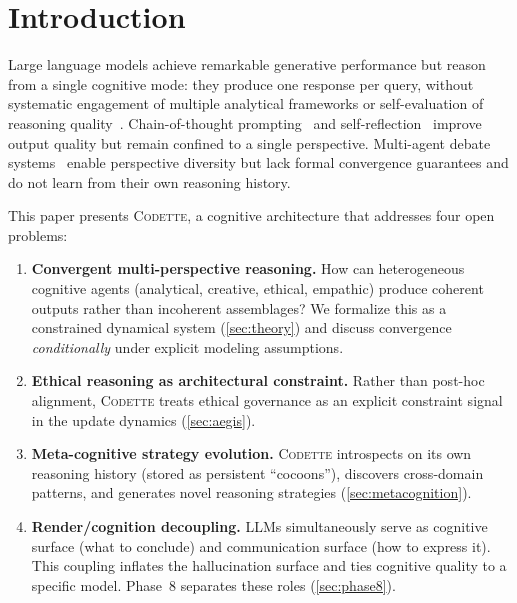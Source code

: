 \documentclass[11pt,a4paper]{article}
\newcommand{\codette}{\textsc{Codette}}
\begin{document}
\section{Introduction}
\label{sec:intro}

Large language models achieve remarkable generative performance but reason
from a single cognitive mode: they produce one response per query, without
systematic engagement of multiple analytical frameworks or self-evaluation of
reasoning quality~\citep{bender2021dangers,bommasani2021opportunities}.
Chain-of-thought prompting~\citep{wei2022chain} and self-reflection~\citep{shinn2023reflexion}
improve output quality but remain confined to a single perspective. Multi-agent
debate systems~\citep{wu2023autogen} enable perspective diversity but lack
formal convergence guarantees and do not learn from their own reasoning
history.

This paper presents \codette{}, a cognitive architecture that addresses four
open problems:

\begin{enumerate}[leftmargin=*]
  \item \textbf{Convergent multi-perspective reasoning.} How can heterogeneous
    cognitive agents (analytical, creative, ethical, empathic) produce coherent
    outputs rather than incoherent assemblages? We formalize this as a
    constrained dynamical system (\cref{sec:theory}) and discuss convergence
    \emph{conditionally} under explicit modeling assumptions.
  \item \textbf{Ethical reasoning as architectural constraint.} Rather than
    post-hoc alignment, \codette{} treats ethical governance as an explicit
    constraint signal in the update dynamics (\cref{sec:aegis}).
  \item \textbf{Meta-cognitive strategy evolution.} \codette{} introspects on
    its own reasoning history (stored as persistent ``cocoons''), discovers
    cross-domain patterns, and generates novel reasoning strategies
    (\cref{sec:metacognition}).
  \item \textbf{Render/cognition decoupling.} LLMs simultaneously serve as
    cognitive surface (what to conclude) and communication surface (how to
    express it). This coupling inflates the hallucination surface and ties
    cognitive quality to a specific model. Phase~8 separates these roles
    (\cref{sec:phase8}).
\end{enumerate}
\end{document}
